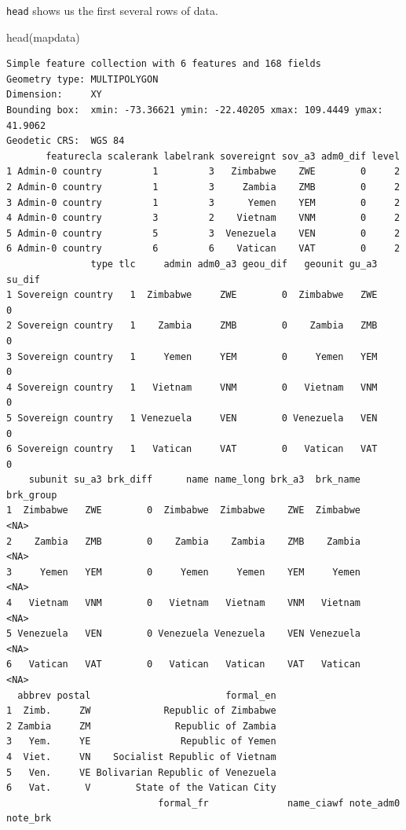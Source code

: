 \documentclass[
  letterpaper,
  DIV=11,
  numbers=noendperiod,
  oneside]{scrreprt}
\newenvironment{Shaded}{\begin{snugshade}}{\end{snugshade}}
\newcommand{\FunctionTok}[1]{\textcolor[rgb]{0.28,0.35,0.67}{#1}}
\newcommand{\NormalTok}[1]{\textcolor[rgb]{0.00,0.23,0.31}{#1}}
\begin{document}
\texttt{head} shows us the first several rows of data.

\begin{Shaded}
\begin{Highlighting}[]
\FunctionTok{head}\NormalTok{(mapdata)}
\end{Highlighting}
\end{Shaded}

\begin{verbatim}
Simple feature collection with 6 features and 168 fields
Geometry type: MULTIPOLYGON
Dimension:     XY
Bounding box:  xmin: -73.36621 ymin: -22.40205 xmax: 109.4449 ymax: 41.9062
Geodetic CRS:  WGS 84
       featurecla scalerank labelrank sovereignt sov_a3 adm0_dif level
1 Admin-0 country         1         3   Zimbabwe    ZWE        0     2
2 Admin-0 country         1         3     Zambia    ZMB        0     2
3 Admin-0 country         1         3      Yemen    YEM        0     2
4 Admin-0 country         3         2    Vietnam    VNM        0     2
5 Admin-0 country         5         3  Venezuela    VEN        0     2
6 Admin-0 country         6         6    Vatican    VAT        0     2
               type tlc     admin adm0_a3 geou_dif   geounit gu_a3 su_dif
1 Sovereign country   1  Zimbabwe     ZWE        0  Zimbabwe   ZWE      0
2 Sovereign country   1    Zambia     ZMB        0    Zambia   ZMB      0
3 Sovereign country   1     Yemen     YEM        0     Yemen   YEM      0
4 Sovereign country   1   Vietnam     VNM        0   Vietnam   VNM      0
5 Sovereign country   1 Venezuela     VEN        0 Venezuela   VEN      0
6 Sovereign country   1   Vatican     VAT        0   Vatican   VAT      0
    subunit su_a3 brk_diff      name name_long brk_a3  brk_name brk_group
1  Zimbabwe   ZWE        0  Zimbabwe  Zimbabwe    ZWE  Zimbabwe      <NA>
2    Zambia   ZMB        0    Zambia    Zambia    ZMB    Zambia      <NA>
3     Yemen   YEM        0     Yemen     Yemen    YEM     Yemen      <NA>
4   Vietnam   VNM        0   Vietnam   Vietnam    VNM   Vietnam      <NA>
5 Venezuela   VEN        0 Venezuela Venezuela    VEN Venezuela      <NA>
6   Vatican   VAT        0   Vatican   Vatican    VAT   Vatican      <NA>
  abbrev postal                        formal_en
1  Zimb.     ZW             Republic of Zimbabwe
2 Zambia     ZM               Republic of Zambia
3   Yem.     YE                Republic of Yemen
4  Viet.     VN    Socialist Republic of Vietnam
5   Ven.     VE Bolivarian Republic of Venezuela
6   Vat.      V        State of the Vatican City
                           formal_fr              name_ciawf note_adm0 note_brk

\end{verbatim}
\end{document}
